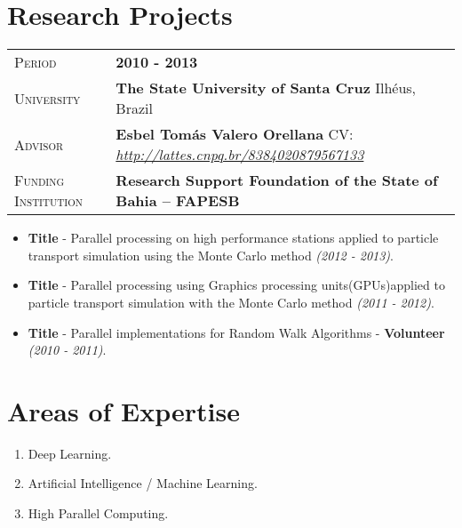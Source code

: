 \documentclass[10pt, a4paper, oneside, final]{scrartcl} %
\newcommand{\gray}{\rowcolor[gray]{.90}} %
\begin{document}
\section{Research Projects}

\begin{center}
\begin{tabularx}{1.0\linewidth}{>{\raggedleft\scshape}p{2.34cm}X}
\gray Period & \textbf{2010 - 2013}\\
\gray University & \textbf{The State University of Santa Cruz} \hfill Ilhéus, Brazil\\
\gray Advisor & \textbf{Esbel Tomás Valero Orellana} \hfill CV: \hyperref[Esbel Valero]{\textit{http://lattes.cnpq.br/8384020879567133}}\\
\gray Funding Institution & \textbf{Research Support Foundation of the State of Bahia – FAPESB}
\end{tabularx}
\end{center}

\begin{itemize}\itemsep1.5pt
\item \textbf{Title} - Parallel processing on high performance stations applied to particle transport simulation using the Monte Carlo method \textit{(2012 - 2013)}.

\item \textbf{Title} - Parallel processing using Graphics processing units(GPUs)applied to particle transport simulation with the Monte Carlo method \textit{(2011 - 2012)}.

\item \textbf{Title} - Parallel implementations for Random Walk Algorithms - \textbf{Volunteer} \textit{(2010 - 2011)}.
\end{itemize}


\section{Areas of Expertise}

\begin{enumerate}\itemsep1.5pt
\item Deep Learning.
\item Artificial Intelligence / Machine Learning.
\item High Parallel Computing.
\end{enumerate}
\end{document}
